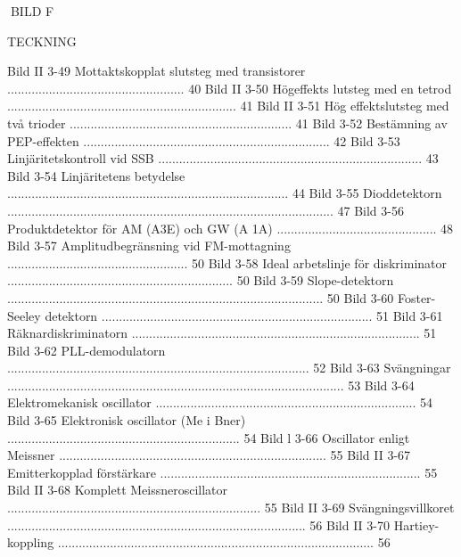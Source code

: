BILD F

TECKNING

Bild II 3-49 Mottaktskopplat slutsteg med transistorer ................................................... 40
Bild II 3-50 Högeffekts lutsteg med en tetrod .................................................................. 41
Bild II 3-51 Hög effektslutsteg med två trioder ................................................................ 41
Bild 3-52 Bestämning av PEP-effekten ....................................................................... 42
Bild 3-53 Linjäritetskontroll vid SSB ............................................................................ 43
Bild 3-54 Linjäritetens betydelse ................................................................................. 44
Bild 3-55 Dioddetektorn .............................................................................................. 47
Bild 3-56 Produktdetektor för AM (A3E) och GW (A 1A) .............................................. 48
Bild 3-57 Amplitudbegränsning vid FM-mottagning .................................................... 50
Bild 3-58 Ideal arbetslinje för diskriminator ................................................................. 50
Bild 3-59 Slope-detektorn ........................................................................................... 50
Bild 3-60 Foster-Seeley detektorn .............................................................................. 51
Bild 3-61 Räknardiskriminatorn ................................................................................... 51
Bild 3-62 PLL-demodulatorn ....................................................................................... 52
Bild 3-63 Svängningar ................................................................................................. 53
Bild 3-64 Elektromekanisk oscillator ........................................................................... 54
Bild 3-65 Elektronisk oscillator (Me i Bner) ................................................................... 54
Bild l 3-66 Oscillator enligt Meissner ............................................................................. 55
Bild II 3-67 Emitterkopplad förstärkare ........................................................................... 55
Bild II 3-68 Komplett Meissneroscillator ......................................................................... 55
Bild II 3-69 Svängningsvillkoret ...................................................................................... 56
Bild II 3-70 Hartiey-koppling ........................................................................................... 56
